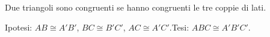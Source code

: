 \begin{teorema}
Due triangoli sono congruenti se hanno congruenti le tre coppie di 
lati.
\end{teorema}


\begin{inaccessibleblock}
 \begin{figure}[htb]
\centering
\end{figure}
\end{inaccessibleblock}

\noindent Ipotesi: $AB\cong A'B'$, $BC\cong B'C'$, $AC\cong 
A'C'$.\tab Tesi: $ABC\cong A'B'C'$.


\begin{inaccessibleblock}
 \begin{figure}[htb]
\centering
\end{figure}
\end{inaccessibleblock}


